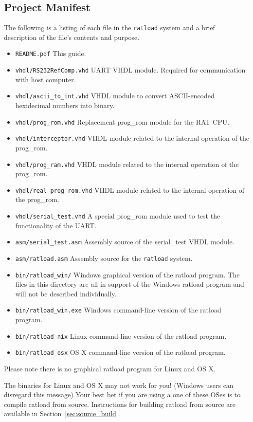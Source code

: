 \documentclass[notitlepage]{article}
\newcommand{\infosign}{\fontencoding{U}\fontfamily{futs}\huge\selectfont\char 116\relax}
\begin{document}
\subsection{Project Manifest}
The following is a listing of each file in the \texttt{ratload} system and a brief description of the file's contents and purpose.
\begin{itemize}
\item \texttt{README.pdf} This guide.
\item \texttt{vhdl/RS232RefComp.vhd} UART VHDL module. Required for communication with host computer.
\item \texttt{vhdl/ascii\_to\_int.vhd} VHDL module to convert ASCII-encoded hexidecimal numbers into binary.
\item \texttt{vhdl/prog\_rom.vhd} Replacement prog\_rom module for the RAT CPU.
\item \texttt{vhdl/interceptor.vhd} VHDL module related to the internal operation of the prog\_rom.
\item \texttt{vhdl/prog\_ram.vhd} VHDL module related to the internal operation of the prog\_rom.
\item \texttt{vhdl/real\_prog\_rom.vhd} VHDL module related to the internal operation of the prog\_rom.
\item \texttt{vhdl/serial\_test.vhd} A special prog\_rom module used to test the functionality of the UART.
\item \texttt{asm/serial\_test.asm} Assembly source of the serial\_test VHDL module.
\item \texttt{asm/ratload.asm} Assembly source for the \texttt{ratload} system.
\item \texttt{bin/ratload\_win/} Windows graphical version of the ratload program. The files in this directory are all in support of the Windows ratload program and will not be described individually.
\item \texttt{bin/ratload\_win.exe} Windows command-line version of the ratload program.
\item \texttt{bin/ratload\_nix} Linux command-line version of the ratload program. 
\item \texttt{bin/ratload\_osx} OS X command-line version of the ratload program.
\end{itemize}
Please note there is no graphical ratload program for Linux and OS X.

\begin{infobox}
  {\infosign} The binaries for Linux and OS X may not work for you! (Windows users can disregard this message) Your best bet if you are using a one of these OSes is to compile ratload from source. Instructions for building ratload from source are available in Section~\ref{sec:source_build}.
\end{infobox}
\end{document}
